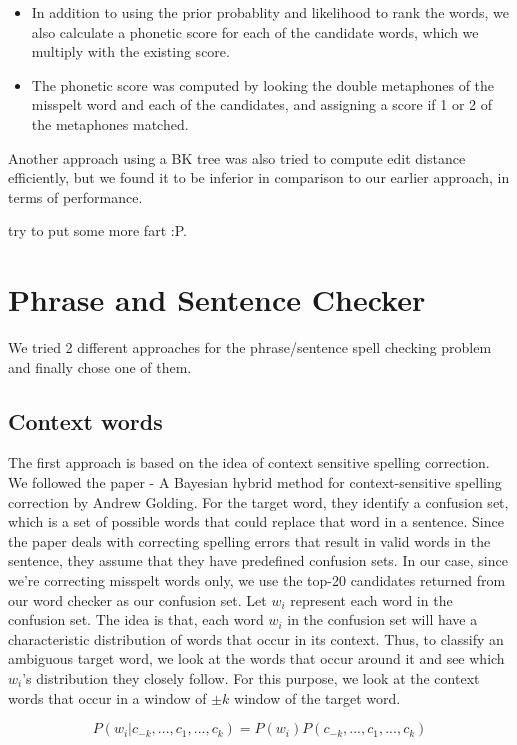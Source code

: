\begin{flushleft}
\begin{itemize}
\item In addition to using the prior probablity and likelihood to rank the words, we also calculate a phonetic score for each of the candidate words, which we multiply with the existing score.

\item The phonetic score was computed by looking the double metaphones of the misspelt word and each of the candidates, and assigning a score if 1 or 2 of the metaphones matched.
\end{itemize}

Another approach using a BK tree was also tried to compute edit distance efficiently, but we found it to be inferior in comparison to our earlier approach, in terms of performance.

try to put some more fart :P.


\end{flushleft}

\section{Phrase and Sentence Checker}
We tried 2 different approaches for the phrase/sentence spell checking problem and finally chose one of them.
\subsection{Context words}
The first approach is based on the idea of context sensitive spelling correction. We followed the paper - A Bayesian hybrid method for context-sensitive spelling correction by Andrew Golding. For the target word, they identify a confusion set, which is a set of possible words that could replace that word in a sentence. Since the paper deals with correcting spelling errors that result in valid words in the sentence, they assume that they have predefined confusion sets. In our case, since we're correcting misspelt words only, we use the top-20 candidates returned from our word checker as our confusion set. Let $w_i$ represent each word in the confusion set. The idea is that, each word $w_i$ in the confusion set will have a
characteristic distribution of words that occur in its context. Thus, to classify an ambiguous target word, we look at the words that occur around it and see which $w_i$'s distribution they closely follow. For this purpose, we look at the context words that occur in a window of $\pm k$ window of the target word. 

\[P(w_i|c_{-k},...,c_{1},...,c_{k}) = P(w_i) P(c_{-k},...,c_{1},...,c_{k})\]

